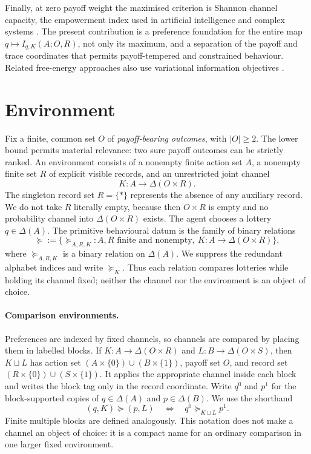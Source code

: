 \documentclass[11pt,a4paper]{article}
\theoremstyle{definition}
\newcommand{\D}{\Delta}
\newcommand{\1}{\mathbf 1}
\begin{document}
Finally, at zero payoff weight the maximised criterion is Shannon channel capacity, the empowerment index used in
artificial intelligence and complex systems \cite{KlyubinPolaniNehaniv2005,SalgeGlackinPolani2014}.  The present
contribution is a preference foundation for the entire map $q\mapsto I_{q,K}(A;O,R)$, not only its maximum, and a
separation of the payoff and trace coordinates that permits payoff-tempered and constrained behaviour.  Related
free-energy approaches also use variational information objectives \cite{Friston2010}.

\section{Environment}

Fix a finite, common set $O$ of \emph{payoff-bearing outcomes}, with $|O|\ge2$.  The lower bound permits material
relevance: two sure payoff outcomes can be strictly ranked.  An environment consists of a nonempty finite action set
$A$, a nonempty finite set $R$ of explicit visible records, and an unrestricted joint channel
\[
  K:A\longrightarrow\D(O\times R).
\]
The singleton record set $R=\{\ast\}$ represents the absence of any auxiliary record.  We do not take $R$ literally
empty, because then $O\times R$ is empty and no probability channel into $\D(O\times R)$ exists.
The agent chooses a lottery $q\in\D(A)$.  The primitive behavioural datum is the family of binary relations
\[
 \boldsymbol{\succeq}
 :=\bigl\{\succeq_{A,R,K}:A,R\text{ finite and nonempty},\ 
 K:A\to\D(O\times R)\bigr\},
\]
where $\succeq_{A,R,K}$ is a binary relation on $\D(A)$.  We suppress the redundant alphabet indices and write
$\succeq_K$.  Thus each relation compares lotteries while holding its channel fixed; neither the channel nor the
environment is an object of choice.

\paragraph{Comparison environments.}
Preferences are indexed by fixed channels, so channels are compared by placing them in labelled blocks.  If
$K:A\to\D(O\times R)$ and $L:B\to\D(O\times S)$, then $K\sqcup L$ has action set
$(A\times\{0\})\cup(B\times\{1\})$, payoff set $O$, and record set
$(R\times\{0\})\cup(S\times\{1\})$.  It applies the appropriate channel inside each block and writes the block tag only
in the record coordinate.  Write $q^0$ and $p^1$ for the block-supported copies of $q\in\D(A)$ and $p\in\D(B)$.  We use
the shorthand
\[
 (q,K)\succeq(p,L)
 \quad\Longleftrightarrow\quad
 q^0\succeq_{K\sqcup L}p^1.
\]
Finite multiple blocks are defined analogously.  This notation does not make a channel an object of choice: it is a
compact name for an ordinary comparison in one larger fixed environment.
\end{document}
